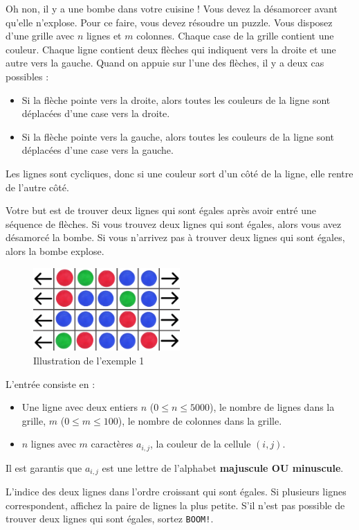 \problemname{\problemyamlname}


Oh non, il y a une bombe dans votre cuisine ! Vous devez la désamorcer avant qu'elle n'explose. Pour ce faire, vous devez résoudre un puzzle.
Vous disposez d'une grille avec $n$ lignes et $m$ colonnes. Chaque case de la grille contient une couleur. Chaque ligne contient deux flèches qui indiquent vers la droite et une autre vers la gauche.
Quand on appuie sur l'une des flèches, il y a deux cas possibles :
\begin{itemize}
    \item Si la flèche pointe vers la droite, alors toutes les couleurs de la ligne sont déplacées d'une case vers la droite.
    \item Si la flèche pointe vers la gauche, alors toutes les couleurs de la ligne sont déplacées d'une case vers la gauche.
\end{itemize}
Les lignes sont cycliques, donc si une couleur sort d'un côté de la ligne, elle rentre de l'autre côté.

Votre but est de trouver deux lignes qui sont égales après avoir entré une séquence de flèches. Si vous trouvez deux lignes qui sont égales, alors vous avez désamorcé la bombe. Si vous n'arrivez pas à trouver deux lignes qui sont égales, alors la bombe explose.

\begin{figure}[H]
    \centering
    \includegraphics[width=0.5\textwidth]{illustration.png}
    \caption{Illustration de l'exemple 1}
\end{figure}

\begin{Input}
    L'entrée consiste en :
    \begin{itemize}
        \item Une ligne avec deux entiers $n$ ($0\leq n \leq 5000$), le nombre de lignes dans la grille, $m$ ($0 \leq m \leq 100$), le nombre de colonnes dans la grille.
        \item $n$ lignes avec $m$ caractères $a_{i,j}$, la couleur de la cellule $(i,j)$.
    \end{itemize}
    Il est garantis que $a_{i,j}$ est une lettre de l'alphabet \textbf{majuscule OU minuscule}.
\end{Input}

\begin{Output}
    L'indice des deux lignes dans l'ordre croissant qui sont égales. Si plusieurs lignes correspondent, affichez la paire de lignes la plus petite. S'il n'est pas possible de trouver deux lignes qui sont égales, sortez \texttt{BOOM!}.
\end{Output}
